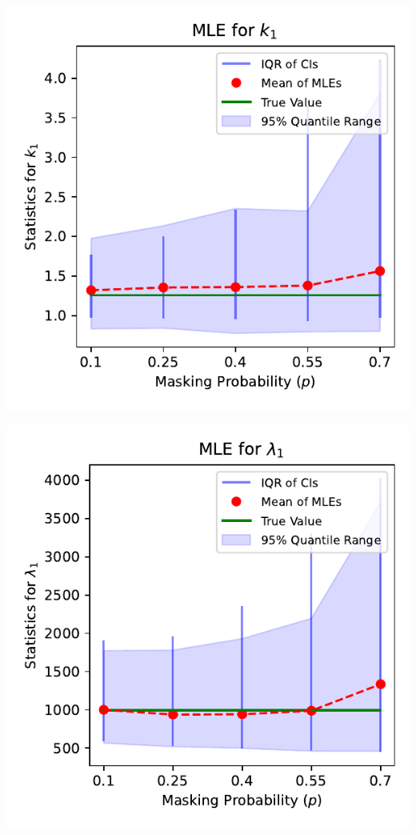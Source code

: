 \documentclass{article}
\begin{document}
\pagestyle{empty}

\noindent
\begin{minipage}[t]{0.45\textwidth}
  \centering
  \includegraphics[width=\textwidth,height=0.33\textheight,keepaspectratio]{plot-p-vs-shape.1.pdf}
\end{minipage}%
\hspace{0.05\textwidth} %
\begin{minipage}[t]{0.45\textwidth}
  \centering
  \includegraphics[width=\textwidth,height=0.33\textheight,keepaspectratio]{plot-p-vs-scale.1.pdf}
\end{minipage}
\end{document}
